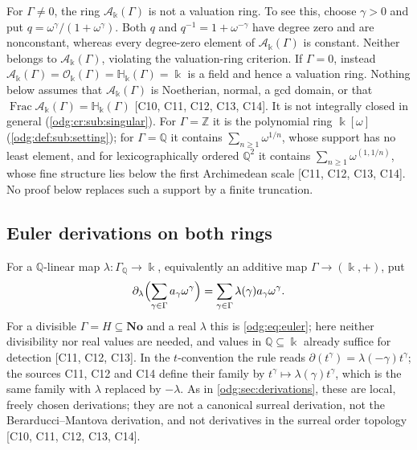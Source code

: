\documentclass[11pt,oneside]{article}
\numberwithin{equation}{section}
\theoremstyle{definition}
\theoremstyle{remark}
\newcommand{\No}{\mathbf{No}}
\newcommand{\Z}{\mathbb Z}
\newcommand{\Q}{\mathbb Q}
\newcommand{\Frac}{\operatorname{Frac}}
\newcommand{\src}[1]{\textup{\textsf{\small[#1]}}}
\newcommand{\crH}{\mathbb H_\Bbbk(\Gamma)}
\newcommand{\crA}{\mathcal A_\Bbbk(\Gamma)}
\newcommand{\crO}{\mathcal O_\Bbbk(\Gamma)}
\begin{document}
For $\Gamma\ne0$, the ring $\crA$ is not a valuation ring. To see this,
choose $\gamma>0$ and put $q=\omega^\gamma/(1+\omega^\gamma)$.
Both $q$ and $q^{-1}=1+\omega^{-\gamma}$ have degree zero and are
nonconstant, whereas every degree-zero element of $\crA$ is constant.
Neither belongs to $\crA$, violating the valuation-ring criterion.
If $\Gamma=0$, instead $\crA=\crO=\crH=\Bbbk$ is a field and hence
a valuation ring. Nothing below assumes that $\crA$ is
Noetherian, normal, a gcd domain, or that $\Frac\crA=\crH$
\src{C10, C11, C12, C13, C14}. It is not integrally closed in general
(\cref{odg:cr:sub:singular}). For $\Gamma=\Z$ it is the polynomial ring
$\Bbbk[\omega]$ (\cref{odg:def:sub:setting}); for $\Gamma=\Q$ it contains
$\sum_{n\ge1}\omega^{1/n}$, whose support has no least element, and for
lexicographically ordered $\Q^2$ it contains $\sum_{n\ge1}\omega^{(1,1/n)}$, whose
fine structure lies below the first Archimedean scale \src{C11, C12, C13, C14}.
No proof below replaces such a support by a finite truncation.

\subsection{Euler derivations on both rings}\label{odg:cr:sub:euler}

For a $\Q$-linear map $\lambda:\Gamma_\Q\to\Bbbk$, equivalently an additive map
$\Gamma\to(\Bbbk,+)$, put
\begin{equation}\label{odg:cr:eq:euler}
 \partial_\lambda\Bigl(\sum_{\gamma\in\Gamma}a_\gamma\omega^\gamma\Bigr)
 =\sum_{\gamma\in\Gamma}\lambda(\gamma)a_\gamma\omega^\gamma .
\end{equation}
For a divisible $\Gamma=H\subseteq\No$ and a real $\lambda$ this is
\eqref{odg:eq:euler}; here neither divisibility nor real values are needed, and
values in $\Q\subseteq\Bbbk$ already suffice for detection
\src{C11, C12, C13}. In the $t$-convention the rule reads
$\partial(t^\gamma)=\lambda(-\gamma)t^\gamma$; the sources C11, C12 and C14 define
their family by $t^\gamma\mapsto\lambda(\gamma)t^\gamma$, which is the same family
with $\lambda$ replaced by $-\lambda$. As in \cref{odg:sec:derivations}, these are
local, freely chosen derivations; they are not a canonical surreal derivation,
not the Berarducci--Mantova derivation, and not derivatives in the surreal
order topology \src{C10, C11, C12, C13, C14}.
\end{document}
